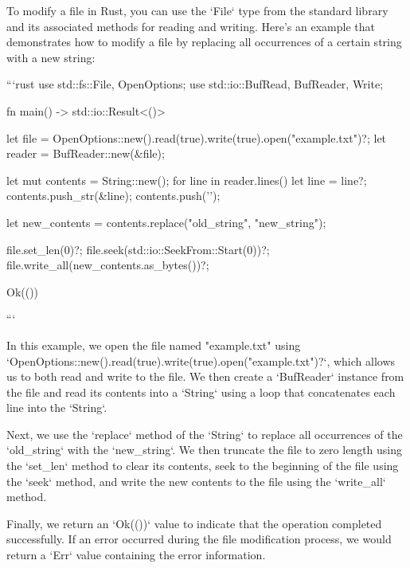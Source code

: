To modify a file in Rust, you can use the `File` type from the standard library and its associated methods for reading and writing. Here's an example that demonstrates how to modify a file by replacing all occurrences of a certain string with a new string:

```rust
use std::fs::{File, OpenOptions};
use std::io::{BufRead, BufReader, Write};

fn main() -> std::io::Result<()> {
    let file = OpenOptions::new().read(true).write(true).open("example.txt")?;
    let reader = BufReader::new(&file);

    let mut contents = String::new();
    for line in reader.lines() {
        let line = line?;
        contents.push_str(&line);
        contents.push('\n');
    }

    let new_contents = contents.replace("old_string", "new_string");

    file.set_len(0)?;
    file.seek(std::io::SeekFrom::Start(0))?;
    file.write_all(new_contents.as_bytes())?;

    Ok(())
}
```

In this example, we open the file named "example.txt" using `OpenOptions::new().read(true).write(true).open("example.txt")?`, which allows us to both read and write to the file. We then create a `BufReader` instance from the file and read its contents into a `String` using a loop that concatenates each line into the `String`.

Next, we use the `replace` method of the `String` to replace all occurrences of the `old_string` with the `new_string`. We then truncate the file to zero length using the `set_len` method to clear its contents, seek to the beginning of the file using the `seek` method, and write the new contents to the file using the `write_all` method.

Finally, we return an `Ok(())` value to indicate that the operation completed successfully. If an error occurred during the file modification process, we would return a `Err` value containing the error information.
